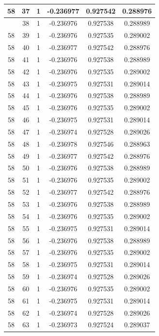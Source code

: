 \documentclass[12pt,a4paper]{article}
\numberwithin{equation}{section}
\numberwithin{figure}{section}
\numberwithin{table}{section}
\begin{document}
\begin{longtable}{|c|c|c|c|c|c|}
58 & 37 & 1 & -0.236977 & 0.927542 & 0.288976 \\ \hline
\pagebreak
58 & 38 & 1 & -0.236976 & 0.927538 & 0.288989 \\ \hline
58 & 39 & 1 & -0.236976 & 0.927535 & 0.289002 \\ \hline
58 & 40 & 1 & -0.236977 & 0.927542 & 0.288976 \\ \hline
58 & 41 & 1 & -0.236976 & 0.927538 & 0.288989 \\ \hline
58 & 42 & 1 & -0.236976 & 0.927535 & 0.289002 \\ \hline
58 & 43 & 1 & -0.236975 & 0.927531 & 0.289014 \\ \hline
58 & 44 & 1 & -0.236976 & 0.927538 & 0.288989 \\ \hline
58 & 45 & 1 & -0.236976 & 0.927535 & 0.289002 \\ \hline
58 & 46 & 1 & -0.236975 & 0.927531 & 0.289014 \\ \hline
58 & 47 & 1 & -0.236974 & 0.927528 & 0.289026 \\ \hline
58 & 48 & 1 & -0.236978 & 0.927546 & 0.288963 \\ \hline
58 & 49 & 1 & -0.236977 & 0.927542 & 0.288976 \\ \hline
58 & 50 & 1 & -0.236976 & 0.927538 & 0.288989 \\ \hline
58 & 51 & 1 & -0.236976 & 0.927535 & 0.289002 \\ \hline
58 & 52 & 1 & -0.236977 & 0.927542 & 0.288976 \\ \hline
58 & 53 & 1 & -0.236976 & 0.927538 & 0.288989 \\ \hline
58 & 54 & 1 & -0.236976 & 0.927535 & 0.289002 \\ \hline
58 & 55 & 1 & -0.236975 & 0.927531 & 0.289014 \\ \hline
58 & 56 & 1 & -0.236976 & 0.927538 & 0.288989 \\ \hline
58 & 57 & 1 & -0.236976 & 0.927535 & 0.289002 \\ \hline
58 & 58 & 1 & -0.236975 & 0.927531 & 0.289014 \\ \hline
58 & 59 & 1 & -0.236974 & 0.927528 & 0.289026 \\ \hline
58 & 60 & 1 & -0.236976 & 0.927535 & 0.289002 \\ \hline
58 & 61 & 1 & -0.236975 & 0.927531 & 0.289014 \\ \hline
58 & 62 & 1 & -0.236974 & 0.927528 & 0.289026 \\ \hline
58 & 63 & 1 & -0.236973 & 0.927524 & 0.289037 \\ \hline

\end{longtable}
\end{document}
